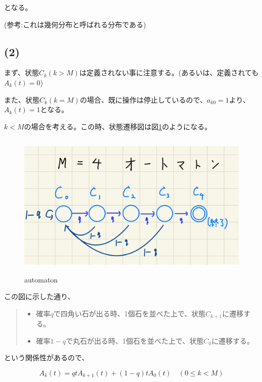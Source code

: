 \documentclass[a4paper, 10pt, dvipdfmx]{jlreq}
\begin{document}
となる。

(参考:これは幾何分布と呼ばれる分布である\cite{site:geo})

\subsection*{(2)}

まず、状態$C_k(k>M)$は定義されない事に注意する。(あるいは、定義されても$A_k(t)=0$)

また、状態$C_k(k=M)$の場合、既に操作は停止しているので、$a_{k0}=1$より、$A_k(t)=1$となる。

$k<M$の場合を考える。この時、状態遷移図は図\ref{img:automaton}のようになる。

\begin{figure}[htbp]
  \begin{center}
    \includegraphics[height=70mm]{automaton.png}
    \caption{automaton}
    \label{img:automaton}
  \end{center}
\end{figure}

この図に示した通り、

\begin{quote}
  \begin{itemize}
    \item 確率$q$で四角い石が出る時、1個石を並べた上で、状態$C_{k+1}$に遷移する。
    \item 確率$1-q$で丸石が出る時、1個石を並べた上で、状態$C_0$に遷移する。
  \end{itemize}
\end{quote}

という関係性があるので、

\begin{equation*}
  A_k(t)=qtA_{k+1}(t)+(1-q)tA_0(t) \quad (0 \leq k < M)
\end{equation*}
\end{document}
